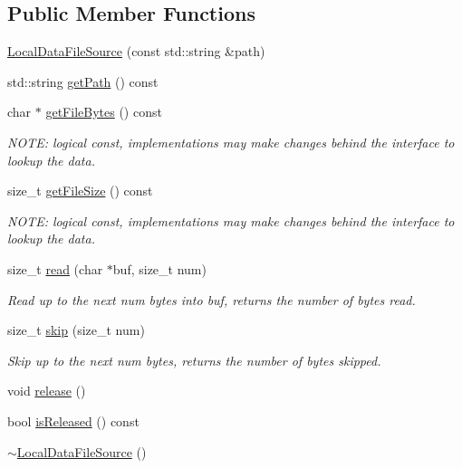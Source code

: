 \subsection*{Public Member Functions}
\begin{DoxyCompactItemize}
\item 
\hyperlink{classBUSBOY_1_1LocalDataFileSource_ab54e3f2b04898b2f5a37b536c242a78b}{LocalDataFileSource} (const std::string \&path)
\item 
std::string \hyperlink{classBUSBOY_1_1LocalDataFileSource_a22b5c087c929d200300ffe914f241c8b}{getPath} () const 
\item 
char $\ast$ \hyperlink{classBUSBOY_1_1LocalDataFileSource_a15f28fad4b6a526d1a0ab341e133bbaa}{getFileBytes} () const 
\begin{DoxyCompactList}\small\item\em NOTE: logical const, implementations may make changes behind the interface to lookup the data. \item\end{DoxyCompactList}\item 
size\_\-t \hyperlink{classBUSBOY_1_1LocalDataFileSource_a2c0ff175265c5460a699910027d3a837}{getFileSize} () const 
\begin{DoxyCompactList}\small\item\em NOTE: logical const, implementations may make changes behind the interface to lookup the data. \item\end{DoxyCompactList}\item 
size\_\-t \hyperlink{classBUSBOY_1_1LocalDataFileSource_af5b845f0dca80268e2d2d58fa101a38b}{read} (char $\ast$buf, size\_\-t num)
\begin{DoxyCompactList}\small\item\em Read up to the next num bytes into buf, returns the number of bytes read. \item\end{DoxyCompactList}\item 
size\_\-t \hyperlink{classBUSBOY_1_1LocalDataFileSource_afe40ac6d9ab78d27b52be6ba234849d4}{skip} (size\_\-t num)
\begin{DoxyCompactList}\small\item\em Skip up to the next num bytes, returns the number of bytes skipped. \item\end{DoxyCompactList}\item 
void \hyperlink{classBUSBOY_1_1LocalDataFileSource_a6c452d0aa712dac330e68e4de6b77ce9}{release} ()
\item 
bool \hyperlink{classBUSBOY_1_1LocalDataFileSource_aa179b315828ee666797dfb91254ab1e1}{isReleased} () const 
\item 
\hyperlink{classBUSBOY_1_1LocalDataFileSource_a7c14304fe18454e0d6c1d3bcc6c4904c}{$\sim$LocalDataFileSource} ()
\end{DoxyCompactItemize}


